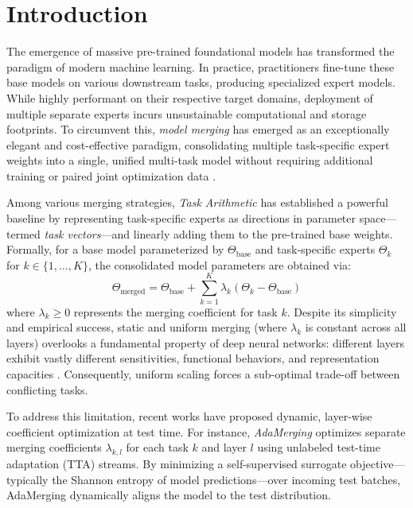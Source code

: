 \section{Introduction}
\label{sec:intro}

The emergence of massive pre-trained foundational models has transformed the paradigm of modern machine learning. In practice, practitioners fine-tune these base models on various downstream tasks, producing specialized expert models. While highly performant on their respective target domains, deployment of multiple separate experts incurs unsustainable computational and storage footprints. To circumvent this, \emph{model merging} has emerged as an exceptionally elegant and cost-effective paradigm, consolidating multiple task-specific expert weights into a single, unified multi-task model without requiring additional training or paired joint optimization data \cite{ilharco2022editing, wortsman2022robust, choshen2022fusing}.

Among various merging strategies, \emph{Task Arithmetic} \cite{ilharco2022editing} has established a powerful baseline by representing task-specific experts as directions in parameter space---termed \emph{task vectors}---and linearly adding them to the pre-trained base weights. Formally, for a base model parameterized by $\Theta_{\text{base}}$ and task-specific experts $\Theta_k$ for $k \in \{1, \dots, K\}$, the consolidated model parameters are obtained via:
\begin{equation}
\Theta_{\text{merged}} = \Theta_{\text{base}} + \sum_{k=1}^K \lambda_k (\Theta_k - \Theta_{\text{base}})
\end{equation}
where $\lambda_k \ge 0$ represents the merging coefficient for task $k$. Despite its simplicity and empirical success, static and uniform merging (where $\lambda_k$ is constant across all layers) overlooks a fundamental property of deep neural networks: different layers exhibit vastly different sensitivities, functional behaviors, and representation capacities \cite{raghu2017svcca}. Consequently, uniform scaling forces a sub-optimal trade-off between conflicting tasks.

To address this limitation, recent works have proposed dynamic, layer-wise coefficient optimization at test time. For instance, \emph{AdaMerging} \cite{lu2023adamerging} optimizes separate merging coefficients $\lambda_{k, l}$ for each task $k$ and layer $l$ using unlabeled test-time adaptation (TTA) streams. By minimizing a self-supervised surrogate objective---typically the Shannon entropy of model predictions---over incoming test batches, AdaMerging dynamically aligns the model to the test distribution. 

